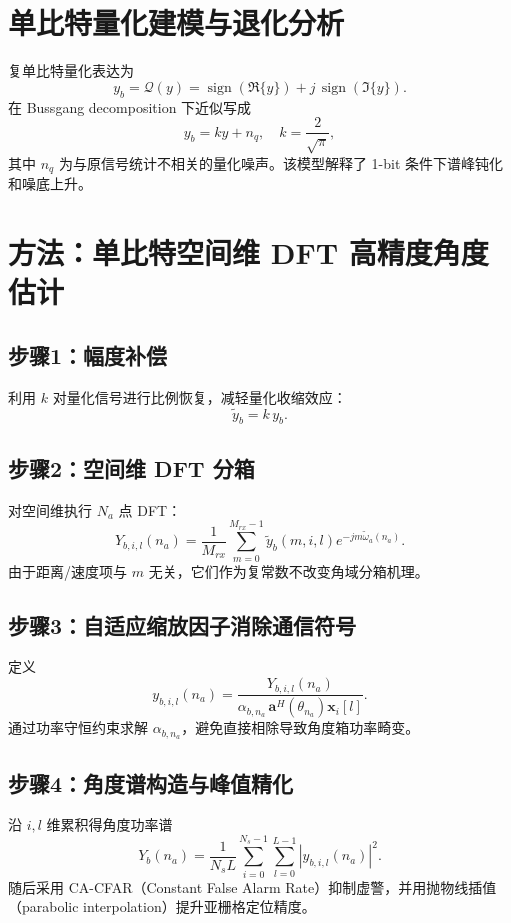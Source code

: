 \documentclass[12pt,a4paper]{ctexart}
\begin{document}
\section{单比特量化建模与退化分析}
复单比特量化表达为
\begin{equation}
  y_b=\mathcal{Q}(y)=\operatorname{sign}(\Re\{y\})+j\,\operatorname{sign}(\Im\{y\}).
\end{equation}
在 Bussgang decomposition 下近似写成
\begin{equation}
  y_b = k y + n_q, \quad k=\frac{2}{\sqrt{\pi}},
\end{equation}
其中 $n_q$ 为与原信号统计不相关的量化噪声。该模型解释了 1-bit 条件下谱峰钝化和噪底上升。

\section{方法：单比特空间维 DFT 高精度角度估计}
\subsection{步骤1：幅度补偿}
利用 $k$ 对量化信号进行比例恢复，减轻量化收缩效应：
\begin{equation}
  \tilde{y}_b = k\,y_b.
\end{equation}

\subsection{步骤2：空间维 DFT 分箱}
对空间维执行 $N_a$ 点 DFT：
\begin{equation}
  Y_{b,i,l}(n_a)=\frac{1}{M_{rx}}\sum_{m=0}^{M_{rx}-1}\tilde{y}_b(m,i,l)e^{-j m\tilde\omega_a(n_a)}.
\end{equation}
由于距离/速度项与 $m$ 无关，它们作为复常数不改变角域分箱机理。

\subsection{步骤3：自适应缩放因子消除通信符号}
定义
\begin{equation}
  y_{b,i,l}(n_a)=\frac{Y_{b,i,l}(n_a)}{\alpha_{b,n_a}\,\mathbf{a}^H(\theta_{n_a})\mathbf{x}_i[l]}.
\end{equation}
通过功率守恒约束求解 $\alpha_{b,n_a}$，避免直接相除导致角度箱功率畸变。

\subsection{步骤4：角度谱构造与峰值精化}
沿 $i,l$ 维累积得角度功率谱
\begin{equation}
  Y_b(n_a)=\frac{1}{N_sL}\sum_{i=0}^{N_s-1}\sum_{l=0}^{L-1}|y_{b,i,l}(n_a)|^2.
\end{equation}
随后采用 CA-CFAR（Constant False Alarm Rate）抑制虚警，并用抛物线插值（parabolic interpolation）提升亚栅格定位精度。
\end{document}
